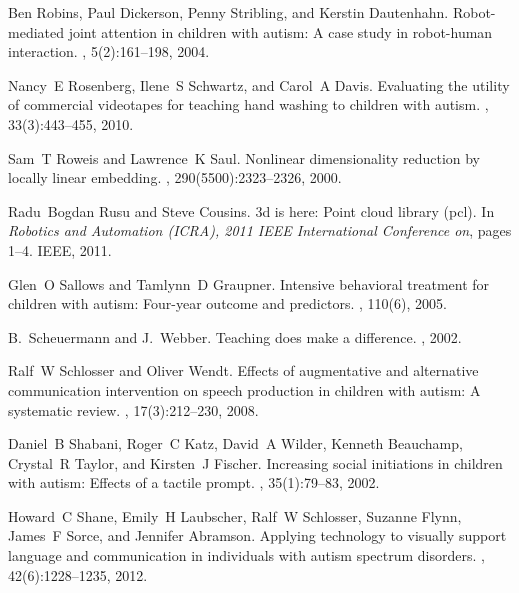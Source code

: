 \documentclass{ut-thesis}
\begin{document}
\begin{thebibliography}{100}
Ben Robins, Paul Dickerson, Penny Stribling, and Kerstin Dautenhahn.
\newblock Robot-mediated joint attention in children with autism: A case study
  in robot-human interaction.
, 5(2):161--198, 2004.

Nancy~E Rosenberg, Ilene~S Schwartz, and Carol~A Davis.
\newblock Evaluating the utility of commercial videotapes for teaching hand
  washing to children with autism.
, 33(3):443--455, 2010.

Sam~T Roweis and Lawrence~K Saul.
\newblock Nonlinear dimensionality reduction by locally linear embedding.
, 290(5500):2323--2326, 2000.

Radu~Bogdan Rusu and Steve Cousins.
\newblock 3d is here: Point cloud library (pcl).
\newblock In {\em Robotics and Automation (ICRA), 2011 IEEE International
  Conference on}, pages 1--4. IEEE, 2011.

Glen~O Sallows and Tamlynn~D Graupner.
\newblock Intensive behavioral treatment for children with autism: Four-year
  outcome and predictors.
, 110(6), 2005.

B.~Scheuermann and J.~Webber.
\newblock Teaching does make a difference.
, 2002.

Ralf~W Schlosser and Oliver Wendt.
\newblock Effects of augmentative and alternative communication intervention on
  speech production in children with autism: A systematic review.
, 17(3):212--230,
  2008.

Daniel~B Shabani, Roger~C Katz, David~A Wilder, Kenneth Beauchamp, Crystal~R
  Taylor, and Kirsten~J Fischer.
\newblock Increasing social initiations in children with autism: Effects of a
  tactile prompt.
, 35(1):79--83, 2002.

Howard~C Shane, Emily~H Laubscher, Ralf~W Schlosser, Suzanne Flynn, James~F
  Sorce, and Jennifer Abramson.
\newblock Applying technology to visually support language and communication in
  individuals with autism spectrum disorders.
,
  42(6):1228--1235, 2012.


\end{thebibliography}
\end{document}
